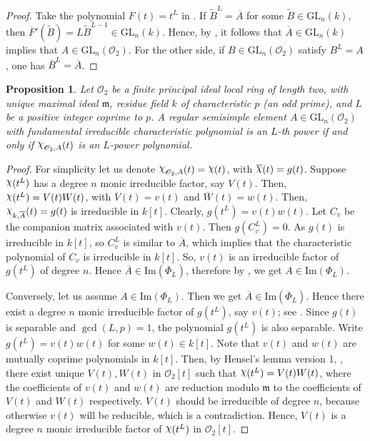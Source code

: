\documentclass[11pt,twoside]{amsart}
\newcommand{\GL}{\mathrm{GL}}
\newcommand{\im}{\mathrm{Im}}
\newcommand{\upchi}{\raisebox{0.4ex}{$\chi$}}
\newcommand{\Char}{\upchi}
\newcommand{\R}{\mathscr{O}_2}
\newtheorem{proposition}[lemma]{Proposition}
\theoremstyle{definition} %
\begin{document}
\begin{proof}
Take the polynomial $F(t) = t^L$ in . If $\widetilde{B}^L = \overline{A}$ for some $\widetilde{B} \in\GL_n(k)$, then $\overline{F}'(\widetilde{B}) = L\widetilde{B}^{L-1} \in \GL_n(k)$. Hence, by , it follows that $\overline{A}\in\GL_n(k)$ implies that $A\in \GL_n(\R)$. For the other side, if $B\in\GL_n(\R)$ satisfy $B^L= A$, one has $\overline{B}^L=\overline{A}$.
\end{proof}
\begin{proposition}\label{prop:reg-sem-baby-case}
Let $\R$ be a finite principal ideal local ring of length two, with unique maximal ideal $\mathfrak m$, residue field $k$ of characteristic $p$ (an odd prime), and $L$ be a positive integer coprime to $p$. 
A regular semisimple element $A\in\GL_n(\R)$ with fundamental irreducible characteristic polynomial is an $L$-th power if and only if $\Char_{\R, A}(t)$ is an $L$-power polynomial.
\end{proposition}
\begin{proof}
For simplicity let us denote $\Char_{\R, A}(t)= \Char(t)$, with $\overline{\Char}(t) = g(t)$. Suppose $\Char(t^L)$ has a degree $n$ monic irreducible factor, say $V(t)$. Then, $\Char(t^L) = V(t)W(t)$, with $\overline{V}(t) = v(t)$  and $\overline{W}(t) = w(t)$.
Then, $\Char_{k,\overline{A}}(t) = g(t)$ is irreducible in $k[t]$. Clearly, ${g}(t^L) = v(t)w(t)$. Let $C_{v}$ be the companion matrix associated with $v(t)$. Then $g(C_{v}^L)= 0$.  As $g(t)$ is irreducible in $k[t]$, so $C_{v}^L$ is similar to $\overline{A}$, which implies that the characteristic polynomial of $C_{v}$ is irreducible in $k[t]$. So, $v(t)$ is an irreducible factor of $g(t^L)$ of degree $n$. Hence $\overline{A} \in \im(\overline{\Phi}_L)$, therefore by , we get $A\in \im(\Phi_L)$.

Conversely, let us assume $A\in \im(\Phi_L)$. Then we get $\overline{A}\in \im(\overline{\Phi}_L)$. 
Hence there exist a degree $n$ monic irreducible factor of ${g}(t^L)$, say ${v}(t)$; see \cite[Theorem 1]{Otero90}. Since $g(t)$ is separable and $\gcd(L, p) = 1$, the polynomial $g(t^L)$ is also separable. Write $g(t^L)= v(t)w(t)$ for some $w(t)\in k[t]$. Note that $v(t)$ and $w(t)$ are mutually coprime polynomials in $k[t]$.
Then, by Hensel's lemma version 1, , there exist unique $V(t), W(t)$ in $\R[t]$ such that $\Char(t^L) = V(t) W(t)$, where the coefficients of $v(t)$ and $w(t)$ are reduction modulo $\mathfrak{m}$ to the coefficients of $V(t)$ and $W(t)$ respectively. $V(t)$ should be irreducible of degree $n$, because otherwise $v(t)$ will be reducible, which is a contradiction. Hence, $V(t)$ is a degree $n$ monic irreducible factor of $\Char(t^L)$ in $\R[t]$.
\end{proof}
\end{document}
